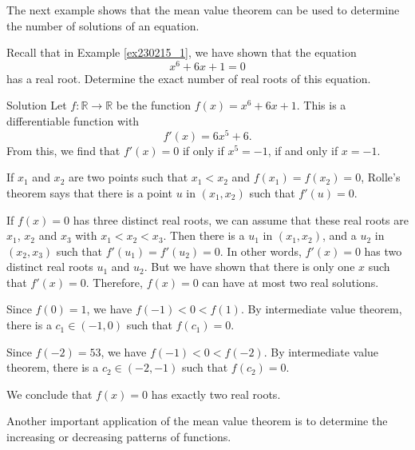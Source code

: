 The next example shows that the mean value theorem can be used to determine the number of solutions of an equation.
\begin{example}{}
Recall that in Example \ref{ex230215_1}, we have shown that the equation 
\[x^6+6x+1=0\]has a real root. Determine the exact number of real roots of this equation.


\end{example}
\begin{solution}{Solution}
Let $f:\mathbb{R}\to\mathbb{R}$ be the function $f(x)=x^6+6x+1$. This is a  differentiable function with\[f'(x)=6x^5+6.\]From this, we find that $f'(x)=0$ if only if $x^5=-1$, if and only if $x=-1$.   

If $x_1$ and $x_2$ are two points such that $x_1<x_2$ and $f(x_1)=f(x_2)=0$,  Rolle's theorem says that there is a point  $u$ in $(x_1, x_2)$  such that $f'(u)=0$. 

\bs
If $f(x)=0$ has three distinct real roots, we can assume that these real roots are $x_1$, $x_2$ and $x_3$ with $x_1<x_2<x_3$. Then there is a $u_1$ in $(x_1, x_2)$, and a $u_2$ in $(x_2, x_3)$ such that  
$f'(u_1)=f'(u_2)=0$. In other words, $f'(x)=0$ has two distinct real  roots $u_1$ and $u_2$. But we have shown that there is only one $x$ such that $f'(x)=0$. Therefore, $f(x)=0$ can have at most two real solutions.

Since $f(0)=1$, we have $f(-1)<0<f(1)$. By intermediate value theorem, there is a $c_1\in (-1, 0)$ such that $f(c_1)=0$.

Since $f(-2)=53$, we have $f(-1)<0<f(-2)$. By intermediate value theorem, there is a $c_2\in (-2, -1)$ such that $f(c_2)=0$. 

We conclude that $f(x)=0$ has exactly two real roots.




\end{solution}
Another important application of the mean value theorem is to determine the increasing or decreasing patterns of functions.

